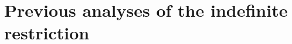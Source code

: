 \documentclass[
]{RCL}
\begin{document}
\section{Previous analyses of the indefinite restriction}\label{sec:LitReview}
%
\end{document}
